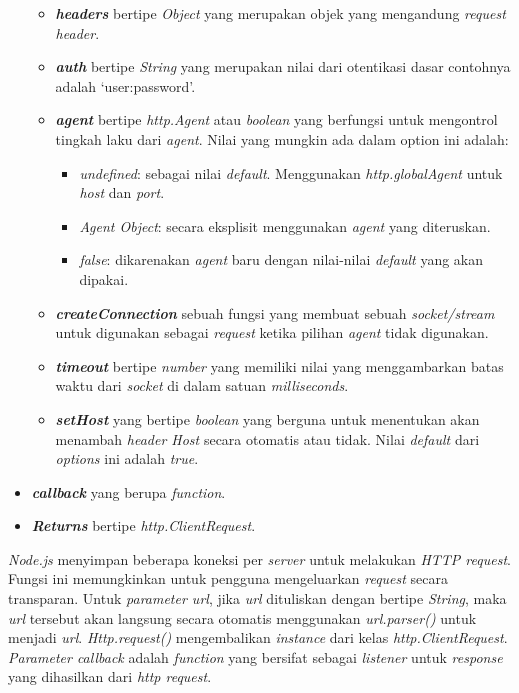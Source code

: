 \begin{itemize}
\begin{itemize}
		\item \textbf{\textit{headers}} bertipe \textit{Object} yang merupakan objek yang mengandung \textit{request header}. 
		\item \textbf{\textit{auth}} bertipe \textit{String} yang merupakan nilai dari otentikasi dasar contohnya adalah `user:password'. 
		\item \textbf{\textit{agent}} bertipe \textit{http.Agent} atau \textit{boolean} yang berfungsi untuk mengontrol tingkah laku dari \textit{agent}. Nilai yang mungkin ada dalam option ini adalah:
		\begin{itemize}
			\item \textit{undefined}: sebagai nilai \textit{default}. Menggunakan \textit{http.globalAgent} untuk \textit{host} dan \textit{port}. 
			\item \textit{Agent Object}: secara eksplisit menggunakan \textit{agent} yang diteruskan. 
			\item \textit{false}: dikarenakan \textit{agent} baru dengan nilai-nilai \textit{default} yang akan dipakai. 
		\end{itemize}		 
		\item \textbf{\textit{createConnection}} sebuah fungsi yang membuat sebuah \textit{socket/stream} untuk digunakan sebagai \textit{request} ketika pilihan \textit{agent} tidak digunakan. 
		\item \textbf{\textit{timeout}} bertipe \textit{number} yang memiliki nilai yang menggambarkan batas waktu dari \textit{socket} di dalam satuan \textit{milliseconds}. 
		\item \textbf{\textit{setHost}} yang bertipe \textit{boolean} yang berguna untuk menentukan akan menambah \textit{header Host} secara otomatis atau tidak. Nilai \textit{default} dari \textit{options} ini adalah \textit{true}. 
	\end{itemize}
	\item \textbf{\textit{callback}} yang berupa \textit{function}. 
	\item \textbf{\textit{Returns}} bertipe \textit{http.ClientRequest}. 
\end{itemize}

\textit{Node.js} menyimpan beberapa koneksi per \textit{server} untuk melakukan \textit{HTTP request}. Fungsi ini memungkinkan untuk pengguna mengeluarkan \textit{request} secara transparan. Untuk \textit{parameter url}, jika \textit{url} dituliskan dengan bertipe \textit{String}, maka \textit{url} tersebut akan langsung secara otomatis menggunakan \textit{url.parser()} untuk menjadi \textit{url}. \textit{Http.request()} mengembalikan \textit{instance} dari kelas \textit{http.ClientRequest}. \textit{Parameter callback} adalah \textit{function} yang bersifat sebagai \textit{listener} untuk \textit{response} yang dihasilkan dari \textit{http request}. 

